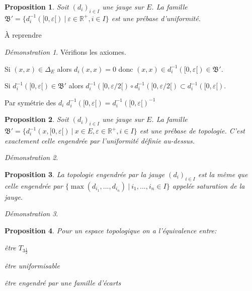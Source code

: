\documentclass[a4paper, 11pt, french]{book}
\newenvironment{itemise}{\itemize}{\enditemize}
\let\colour=\color
\theoremstyle{plain} %
\newtheorem{proposition}{Proposition}
\theoremstyle{definition} %
\theoremstyle{remark} %
\newtheorem*{demonstration}{Démonstration}
\newcommand{\1}{\mathds{1}}
\newcommand{\inv}[1]{#1^{-1}}
\newcommand{\R}{\mathbb{R}}
\renewcommand{\frak}[1]{\mathfrak{#1}}
\newcommand\ens[2]{\{#1 \ |\ #2\}}
\begin{document}
\begin{proposition}
	Soit $(d_i)_{i\in I}$ une jauge sur $E$.
	La famille $\frak{B}'=\ens{\inv{d_i}([0, \varepsilon[)}{\varepsilon\in\R^+, i\in I}$ est une prébase d'uniformité.
\end{proposition}

{\colour{red} À reprendre}

\begin{demonstration}
	Vérifions les axiomes.
	\begin{itemise}
		\item Si $(x, x)\in\Delta_E$ alors $d_i(x, x)=0$ donc $(x, x)\in\inv{d_i}([0, \varepsilon[)\in\frak{B}'$.
		\item Si $\inv{d_i}([0, \varepsilon[)\in\frak{B}'$ alors $\inv{d_i}([0, \varepsilon/2[)\circ \inv{d_i}([0, \varepsilon/2[)\subset\inv{d_i}([0, \varepsilon[)$.
		\item Par symétrie des $d_i$ $\inv{d_i}([0, \varepsilon[)=\inv{\inv{d_i}([0, \varepsilon[)}$
	\end{itemise}
\end{demonstration}

\begin{proposition}
	Soit $(d_i)_{i\in I}$ une jauge sur $E$.
	La famille $\frak{B}'=\ens{\inv{d_i}(x, [0, \varepsilon[)}{x\in E, \varepsilon\in\R^+, i\in I}$ est une prébase de topologie.
	C'est exactement celle engendrée par l'uniformité définie au-dessus.
\end{proposition}

\begin{demonstration}
	\colour{red}{À démontrer}
\end{demonstration}

\begin{proposition}
	La topologie engendrée par la jauge $(d_i)_{i\in I}$ est la même que celle engendrée par $\ens{\max(d_{i_1}, ..., d_{i_n})}{i_1, ..., i_n\in I}$ appelée saturation de la jauge.
\end{proposition}

\begin{demonstration}
	\colour{red}{À démontrer}
\end{demonstration}

\begin{proposition}
	Pour un espace topologique on a l'équivalence entre:
	\begin{itemise}
		\item être $T_{3\frac{1}{2}}$
		\item être uniformisable
		\item être engendré par une famille d'écarts
	\end{itemise}
\end{proposition}
\end{document}
